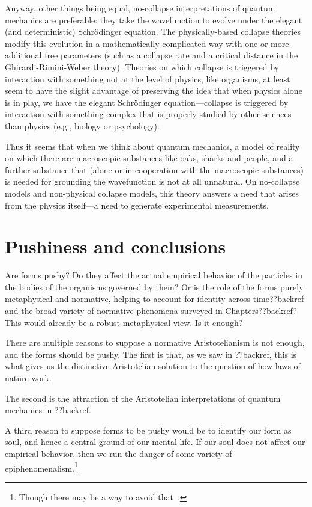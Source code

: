 Anyway, other things being equal, no-collapse interpretations of quantum mechanics are preferable: they take the wavefunction 
to evolve under the elegant (and deterministic) Schr\"{o}dinger equation. The physically-based collapse theories modify this
evolution in a mathematically complicated way with one or more additional free parameters (such as a collapse rate and a
critical distance in the Ghirardi-Rimini-Weber theory). Theories on which collapse is triggered by interaction with something
not at the level of physics, like organisms, at least seem to have the slight advantage of preserving the idea that when physics alone is in play,
we have the elegant Schr\"{o}dinger equation---collapse is triggered by interaction with something complex that is properly 
studied by other sciences than physics (e.g., biology or psychology). 

Thus it seems that when we think about quantum mechanics, a model of reality on which there are macroscopic substances like
oaks, sharks and people, and a further substance that (alone or in cooperation with the macroscopic substances) is needed
for grounding the wavefunction is not at all unnatural. On no-collapse models and non-physical collapse models, this theory 
answers a need that arises from the physics itself---a need to generate experimental measurements.

\section{Pushiness and conclusions}
Are forms pushy? Do they affect the actual empirical behavior of the particles in the bodies of the organisms governed by them?
Or is the role of the forms purely metaphysical and normative, helping to account for identity across time??backref
and the broad variety of normative phenomena surveyed in Chapters??backref? This would already be a robust metaphysical
view. Is it enough?

There are multiple reasons to suppose a normative Aristotelianism is not enough, and the forms should be pushy. The first is that, as we saw in ??backref, this is what 
gives us the distinctive Aristotelian solution to the question of how laws of nature work. 

The second is the attraction of the Aristotelian interpretations of quantum mechanics in ??backref.

A third reason to suppose forms to be pushy would be to identify our form as soul, and hence a central ground 
of our mental life. If our soul does not affect our empirical behavior, then we run the danger of some variety of epiphenomenalism.\footnote{Though there may be a way to avoid that~\parencite{PrussRickabaugh}.}

